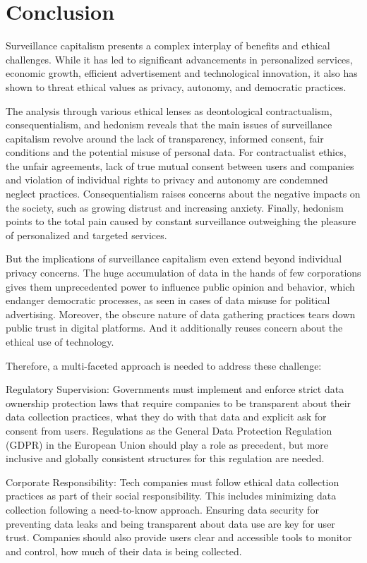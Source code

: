 
\section{Conclusion}\label{sec:conclusion}
Surveillance capitalism presents a complex interplay of benefits and ethical challenges.
While it has led to significant advancements in personalized services, economic growth, efficient advertisement and technological innovation, it also has shown to threat ethical values as privacy, autonomy, and democratic practices.

The analysis through various ethical lenses as deontological contractualism, consequentialism, and hedonism reveals that the main issues of surveillance capitalism revolve around the lack of transparency, informed consent, fair conditions and the potential misuse of personal data.
For contractualist ethics, the unfair agreements, lack of true mutual consent between users and companies and violation of individual rights to privacy and autonomy are condemned neglect practices.
Consequentialism raises concerns about the negative impacts on the society, such as growing distrust and increasing anxiety.
Finally, hedonism points to the total pain caused by constant surveillance outweighing the pleasure of personalized and targeted services.

But the implications of surveillance capitalism even extend beyond individual privacy concerns.
The huge accumulation of data in the hands of few corporations gives them unprecedented power to influence public opinion and behavior, which endanger democratic processes, as seen in cases of data misuse for political advertising.
Moreover, the obscure nature of data gathering practices tears down public trust in digital platforms.
And it additionally reuses concern about the ethical use of technology.

Therefore, a multi-faceted approach is needed to address these challenge:

Regulatory Supervision: Governments must implement and enforce strict data ownership protection laws that require companies to be transparent about their data collection practices, what they do with that data and explicit ask for consent from users.
Regulations as the General Data Protection Regulation (GDPR) in the European Union should play a role as precedent, but more inclusive and globally consistent structures for this regulation are needed.

Corporate Responsibility: Tech companies must follow ethical data collection practices as part of their social responsibility.
This includes minimizing data collection following a need-to-know approach.
Ensuring data security for preventing data leaks and being transparent about data use are key for user trust.
Companies should also provide users clear and accessible tools to monitor and control, how much of their data is being collected.

